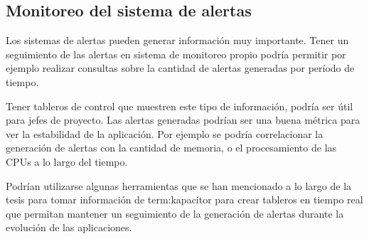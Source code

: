 \subsection{Monitoreo del sistema de alertas}
\label{del-sistema-de-alertas}

Los sistemas de alertas pueden generar información muy importante. Tener un
seguimiento de las alertas en sistema de monitoreo propio podría permitir por ejemplo realizar consultas sobre la cantidad de alertas generadas por período de
tiempo.

Tener tableros de control que muestren este tipo de información, podría ser
útil para jefes de proyecto. Las alertas generadas podrían ser una buena
métrica para ver la estabilidad de la aplicación. Por ejemplo se podría
correlacionar la generación de alertas con la cantidad de memoria, o el
procesamiento de las CPUs a lo largo del tiempo.

Podrían utilizarse algunas herramientas que se han mencionado a lo
largo de la tesis para tomar información de \gls{term:kapacitor} para crear
tableros en tiempo real que permitan mantener un seguimiento de la generación de
alertas durante la evolución de las aplicaciones.
